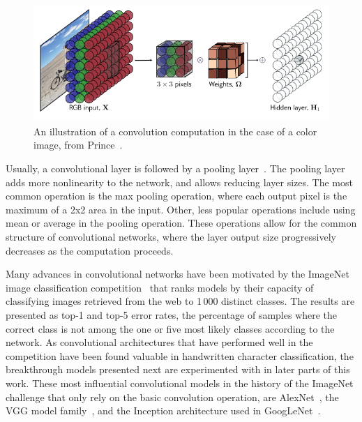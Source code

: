 \documentclass[english,twoside,openright]{UH_DS_MSc}
\begin{document}
\begin{figure}[ht]
    \centering
    \includegraphics*[scale=0.4]{images/3dkernel.png}
    \caption{An illustration of a convolution computation in the case of a color image, from Prince~\cite{princebook}.}
    \label{image:3dkernel}
\end{figure}

Usually, a convolutional layer is followed by a pooling layer~\cite{princebook}. The pooling layer adds more nonlinearity to the network, and allows reducing layer sizes. The most common operation is the max pooling operation, where each output pixel is the maximum of
a 2x2 area in the input. Other, less popular operations include using mean or average in the pooling operation. These operations allow for the common structure of convolutional networks, where the layer output size progressively decreases as the computation proceeds.

Many advances in convolutional networks have been motivated by the ImageNet image classification competition~\cite{imagenet}
 that ranks models by their capacity of classifying images retrieved from the web to 1\,000 distinct classes.
 The results are presented as top-1 and top-5 error rates, the percentage of samples 
where the correct class is not among the one or five most likely classes according to the network. As convolutional architectures
that have performed well in the competition have been found valuable in handwritten character classification, the 
breakthrough models presented next are experimented with in later parts of this work.
These most influential convolutional models in the history of the ImageNet challenge  that
only rely on the basic convolution operation, are AlexNet~\cite{alexnet}, 
the VGG model family~\cite{vgg}, and
the Inception architecture used in GoogLeNet~\cite{googlelenet}.
\end{document}
